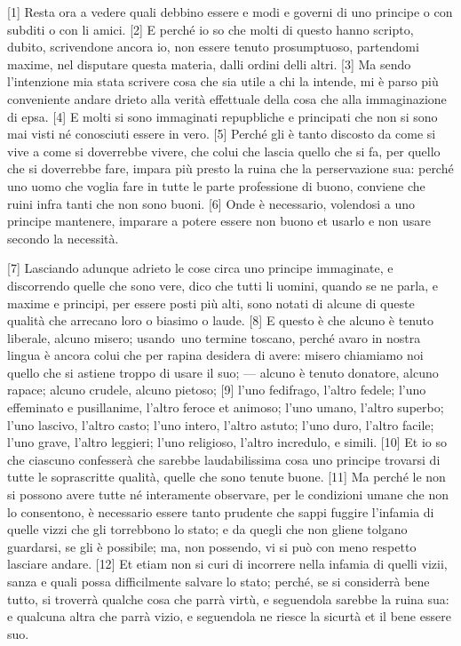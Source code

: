 {[}1{]} Resta ora a vedere quali debbino essere e modi e governi di uno
principe o con subditi o con li amici. {[}2{]} E perché io so che molti
di questo hanno scripto, dubito, scrivendone ancora io, non essere
tenuto prosumptuoso, partendomi maxime, nel disputare questa materia,
dalli ordini delli altri. {[}3{]} Ma sendo l'intenzione mia stata
scrivere cosa che sia utile a chi la intende, mi è parso più conveniente
andare drieto alla verità effettuale della cosa che alla immaginazione
di epsa. {[}4{]} E molti si sono immaginati repupbliche e principati che
non si sono mai visti né conosciuti essere in vero. {[}5{]} Perché gli è
tanto discosto da come si vive a come si doverrebbe vivere, che colui
che lascia quello che si fa, per quello che si doverrebbe fare, impara
più presto la ruina che la perservazione sua: perché uno uomo che voglia
fare in tutte le parte professione di buono, conviene che ruini infra
tanti che non sono buoni. {[}6{]} Onde è necessario, volendosi a uno
principe mantenere, imparare a potere essere non buono et usarlo e non
usare secondo la necessità.

{[}7{]} Lasciando adunque adrieto le cose circa uno principe immaginate,
e discorrendo quelle che sono vere, dico che tutti li uomini, quando se
ne parla, e maxime e principi, per essere posti più alti, sono notati di
alcune di queste qualità che arrecano loro o biasimo o laude. {[}8{]} E
questo è che alcuno è tenuto liberale, alcuno misero; usando\est\ uno termine
toscano, perché avaro in nostra lingua è ancora colui che per rapina
desidera di avere: misero chiamiamo noi quello che si astiene troppo di
usare il suo; --- alcuno è tenuto donatore, alcuno rapace; alcuno
crudele, alcuno pietoso; {[}9{]} l'uno fedifrago, l'altro fedele; l'uno
effeminato e pusillanime, l'altro feroce et animoso; l'uno umano,
l'altro superbo; l'uno lascivo, l'altro casto; l'uno intero, l'altro
astuto; l'uno duro, l'altro facile; l'uno grave, l'altro leggieri; l'uno
religioso, l'altro incredulo, e simili. {[}10{]} Et io so che ciascuno
confesserà che sarebbe laudabilissima cosa uno principe trovarsi di
tutte le soprascritte qualità, quelle che sono tenute buone. {[}11{]} Ma
perché le non si possono avere tutte né interamente observare, per le
condizioni umane che non lo consentono, è necessario essere tanto
prudente che sappi fuggire l'infamia di quelle vizzi che gli torrebbono
lo stato; e da quegli che non gliene tolgano guardarsi, se gli è
possibile; ma, non possendo, vi si può con meno respetto lasciare
andare. {[}12{]} Et etiam non si curi di incorrere nella infamia di
quelli vizii, sanza e quali possa difficilmente salvare lo stato;
perché, se si considerrà bene tutto, si troverrà qualche cosa che parrà
virtù, e seguendola sarebbe la ruina sua: e qualcuna altra che parrà
vizio, e seguendola ne riesce la sicurtà et il bene essere suo.

